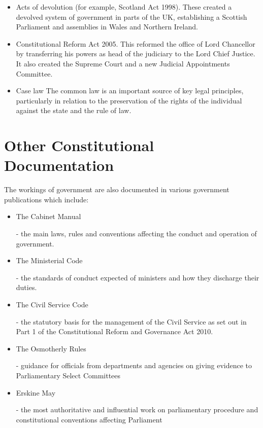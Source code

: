 \documentclass[14pt,titlepage]{extarticle}
\begin{document}
\begin{itemize}
\item Acts of devolution (for example, Scotland Act 1998). These created a devolved system of government in parts of the UK, establishing a Scottish Parliament and assemblies in Wales and Northern Ireland.

\item Constitutional Reform Act 2005. This reformed the office of Lord Chancellor by transferring his powers as head of the judiciary to the Lord Chief Justice. It also created the Supreme Court and a new Judicial Appointments Committee.

\item Case law
The common law is an important source of key legal principles, particularly in relation to the preservation of the rights of the individual against the state and the rule of law.
\end{itemize}

\section{Other Constitutional Documentation}

The workings of government are also documented in various government publications which include:

\begin{itemize}
\item The Cabinet Manual \cite{rbjw005}
  
  - the main laws, rules and conventions affecting the conduct and operation of government.

\item The Ministerial Code \cite{rbjw006}

  - the standards of conduct expected of ministers and how they discharge their duties.
  
\item The Civil Service Code \cite{rbjw007}

  - the statutory basis for the management of the Civil Service as set out in Part 1 of the Constitutional Reform and Governance Act 2010.

\item The Osmotherly Rules \cite{rbjw008}
  
  - guidance for officials from departments and agencies on giving evidence to Parliamentary Select Committees
\item Erskine May \cite{rbjw009,rbjw010}

  - the most authoritative and influential work on parliamentary procedure and constitutional conventions affecting Parliament
\end{itemize}
\end{document}

